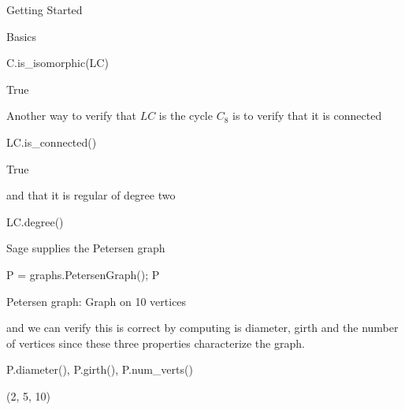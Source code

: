 \begin{chap}{Getting Started}
\begin{sect}{Basics}
\begin{sagecode}
\begin{sageinput}
C.is_isomorphic(LC)
\end{sageinput}
\begin{sageoutput}
True
\end{sageoutput}
\end{sagecode}
%
\begin{para}
Another way to verify that $LC$ is the cycle $C_8$ is to verify that it
is connected
\end{para}
%
\begin{sagecode}
\begin{sageinput}
LC.is_connected()
\end{sageinput}
\begin{sageoutput}
True
\end{sageoutput}
\end{sagecode}
%
\begin{para}
and that it is regular of degree two
\end{para}
%
\begin{sagecode}
\begin{sageinput}
LC.degree()
\end{sageinput}
\begin{sageoutput}
[2, 2, 2, 2, 2, 2, 2, 2]
\end{sageoutput}
\end{sagecode}
%
\begin{para}
Sage supplies the Petersen graph
\end{para}
%
\begin{sagecode}
\begin{sageinput}
P = graphs.PetersenGraph(); P
\end{sageinput}
\begin{sageoutput}
Petersen graph: Graph on 10 vertices
\end{sageoutput}
\end{sagecode}
%
\begin{para}
and we can verify this is correct by computing is diameter, girth
and the number of vertices since these three properties characterize the graph.
\end{para}
%
\begin{sagecode}
\begin{sageinput}
P.diameter(), P.girth(), P.num_verts()
\end{sageinput}
\begin{sageoutput}
(2, 5, 10)   
\end{sageoutput}
\end{sagecode}
%
\begin{para}

\end{para}
\end{sect}
\end{chap}
